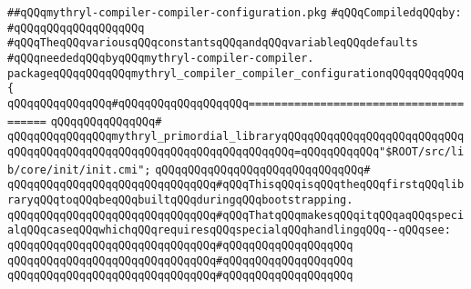 \label{src/app/makelib/mythryl-compiler-compiler/mythryl-compiler-compiler-configuration.pkg}
\verb|##qQQqmythryl-compiler-compiler-configuration.pkg|\newline
\newline
\verb|#qQQqCompiledqQQqby:|\newline
\verb|#qQQqqQQqqQQqqQQqqQQq|\newline
\newline
\newline
\newline
\verb|#qQQqTheqQQqvariousqQQqconstantsqQQqandqQQqvariableqQQqdefaults|\newline
\verb|#qQQqneededqQQqbyqQQqmythryl-compiler-compiler.|\newline
\newline
\newline
\newline
\verb|packageqQQqqQQqqQQqmythryl_compiler_compiler_configurationqQQqqQQqqQQq{|\newline
\verb|qQQqqQQqqQQqqQQq#qQQqqQQqqQQqqQQqqQQq=======================================|\newline
\verb|qQQqqQQqqQQqqQQq#|\newline
\verb|qQQqqQQqqQQqqQQqmythryl_primordial_libraryqQQqqQQqqQQqqQQqqQQqqQQqqQQqqQQqqQQqqQQqqQQqqQQqqQQqqQQqqQQqqQQqqQQqqQQq=qQQqqQQqqQQq"$ROOT/src/lib/core/init/init.cmi";|\newline
\verb|qQQqqQQqqQQqqQQqqQQqqQQqqQQqqQQq#|\newline
\verb|qQQqqQQqqQQqqQQqqQQqqQQqqQQqqQQq#qQQqThisqQQqisqQQqtheqQQqfirstqQQqlibraryqQQqtoqQQqbeqQQqbuiltqQQqduringqQQqbootstrapping.|\newline
\verb|qQQqqQQqqQQqqQQqqQQqqQQqqQQqqQQq#qQQqThatqQQqmakesqQQqitqQQqaqQQqspecialqQQqcaseqQQqwhichqQQqrequiresqQQqspecialqQQqhandlingqQQq--qQQqsee:|\newline
\verb|qQQqqQQqqQQqqQQqqQQqqQQqqQQqqQQq#qQQqqQQqqQQqqQQqqQQq|\newline
\verb|qQQqqQQqqQQqqQQqqQQqqQQqqQQqqQQq#qQQqqQQqqQQqqQQqqQQq|\newline
\verb|qQQqqQQqqQQqqQQqqQQqqQQqqQQqqQQq#qQQqqQQqqQQqqQQqqQQq|\newline
